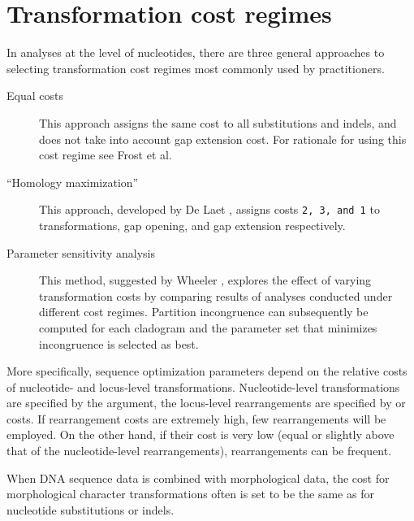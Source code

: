 \section{Transformation cost regimes}
In analyses at the level of nucleotides, there are three general approaches to selecting transformation cost regimes 
most commonly used by \poy practitioners.
\begin{description}
\item[Equal costs] This approach assigns the same cost to all substitutions and indels, and does not take into 
account gap extension cost. For rationale for using this cost regime see Frost et al. \cite{frost2001} %
\item[``Homology maximization''] This approach, developed by De Laet \cite{delaet2005}, assigns costs 
\texttt{2, 3, and 1} to transformations, gap opening, and gap extension respectively. %
\item[Parameter sensitivity analysis] This method, suggested by Wheeler \cite{wheeler1995}, explores the 
effect of varying transformation costs by comparing results of analyses conducted under different cost regimes. 
Partition incongruence can subsequently be computed  for each cladogram and the parameter set that minimizes 
incongruence is selected as best. %
\end{description}
More specifically, sequence optimization parameters depend on the relative costs of nucleotide- and locus-level transformations. 
Nucleotide-level transformations are specified by the  argument, the locus-level rearrangements are specified by 
 or  costs. If  rearrangement costs are extremely high, few 
rearrangements will be employed. On the other hand, if their cost is very low (equal or slightly above that of the nucleotide-level 
rearrangements), rearrangements can be frequent.

When DNA sequence data is combined with morphological data, the cost for morphological character transformations 
often is  set to be the same as for 
nucleotide substitutions or indels.


